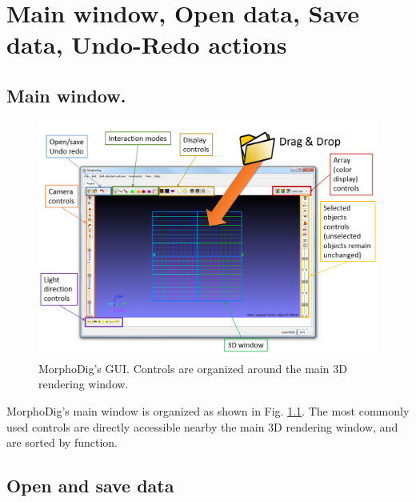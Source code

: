 \chapter{Main window, Open data, Save data, Undo-Redo actions}
\minitoc  

\section{Main window.}
\begin{figure}
  \centering
  \includegraphics[scale=0.3]{images/03/morphodig_gui.png} 
	\caption{MorphoDig's GUI. Controls are organized around the main 3D rendering window.}
\label{gui}
 
\end{figure}

MorphoDig's main window is organized as shown in Fig. \ref{gui}. The most commonly used controls are directly accessible nearby the main 3D rendering window, and are sorted by function. 

 \section{Open and save data}



